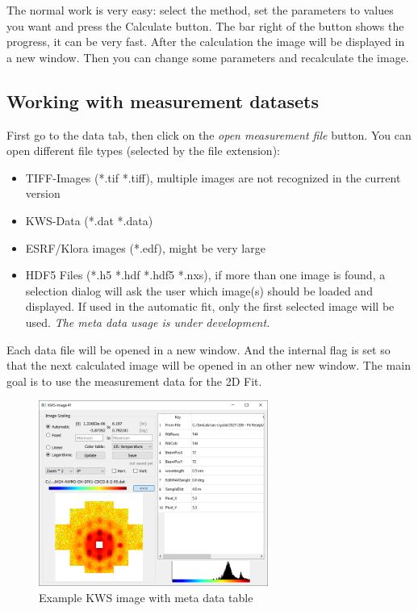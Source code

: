 \documentclass[11pt]{article} %
\begin{document}
The normal work is very easy: select the method, set the parameters to values you want and press the Calculate button. The bar right of the button shows the progress, it can be very fast. After the calculation the image will be displayed in a new window. Then you can change some parameters and recalculate the image.

\subsection{Working with measurement datasets}

First go to the data tab, then click on the {\it open measurement file} button. You can open different file types (selected by the file extension):
\begin{itemize}\itemsep0pt
\item TIFF-Images (*.tif *.tiff), multiple images are not recognized in the current version
\item KWS-Data (*.dat *.data)
\item ESRF/Klora images (*.edf), might be very large
\item HDF5 Files (*.h5 *.hdf *.hdf5 *.nxs), if more than one image is found, a selection dialog will ask the user which image(s) should be loaded and displayed. If used in the automatic fit, only the first selected image will be used. {\it The meta data usage is under development.}
\end{itemize}
Each data file will be opened in a new window. And the internal flag is set so that the next calculated image will be opened in an other new window. The main goal is to use the measurement data for the 2D Fit.
\begin{figure}[H]
 \centering
 \includegraphics[width=0.67\textwidth]{img-kwsdata-meta.png}
 \caption{Example KWS image with meta data table}
\end{figure}
\end{document}
